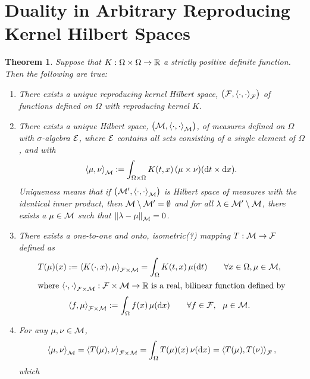 \documentclass[reqno]{amsart}
\newtheorem{theorem}{Theorem}
\begin{document}
\section{Duality in Arbitrary Reproducing Kernel Hilbert Spaces}

\begin{theorem} Suppose that $K: \Omega \times \Omega \to \reals$ a strictly positive definite function.  Then the following are true:
\begin{enumerate}
\renewcommand{\labelenumi}{\roman{enumi})}

    \item There exists a unique reproducing kernel Hilbert space, $\bigl(\cf,\ip[\cf]{\cdot}{\cdot}\bigr)$ of functions defined on $\Omega$ with reproducing kernel $K$.
    
    \item There exists a unique Hilbert space, $\bigl(\cm,\ip[\cm]{\cdot}{\cdot}\bigr)$, of measures defined on $\Omega$ with $\sigma$-algebra $\ce$, where $\ce$ contains all sets consisting of a single element of $\Omega$, and with
    \begin{equation} \label{eq:Mipdef}
    \ip[\cm]{\mu}{\nu} := \int_{\Omega \times \Omega} K(t,x) \, (\mu \times \nu) (\dif t \times \dif x).
    \end{equation}
    Uniqueness means that if $\bigl(\cm',\ip[\cm]{\cdot}{\cdot}\bigr)$ is Hilbert space of measures with the identical inner product, then $\cm \setminus \cm' = \emptyset$ and for all $\lambda \in \cm' \setminus \cm$, there exists a $\mu \in \cm$ such that $\norm[\cm]{\lambda - \mu} = 0$.
    
    
    \item \label{thmiii} There exists a \emph{one-to-one and onto, isometric(?) mapping} $T : \cm \to \cf$ defined as 
    \begin{subequations}
\begin{gather}
    T(\mu)(x) := \ip[\cf \times \cm]{K(\cdot, x)}{\mu} = \int_\Omega K(t, x) \, \mu(\dif t) \qquad \forall x \in \Omega, \mu \in \cm, \\
    \intertext{where $ \ip[\cf \times \cm]{\cdot}{\cdot} : \cf \times \cm \to \reals$ is a real, bilinear function defined by} 
    \ip[\cf \times \cm]{f}{\mu} := \int_\Omega f(x) \, \mu(\dif x) \qquad \forall f \in \cf, \ \  \mu \in \cm.
\end{gather}
\end{subequations}



\item For any $\mu, \nu \in \cm$,
\begin{equation}
    \ip[\cm]{\mu}{\nu} = \ip[\cf \times \cm]{T(\mu)}{\nu} = \int_\Omega T(\mu)(x) \, \nu(\dif x) = \ip[\cf]{T(\mu)}{T(\nu)},
\end{equation}
which 
\end{enumerate}

\end{theorem}
\end{document}
